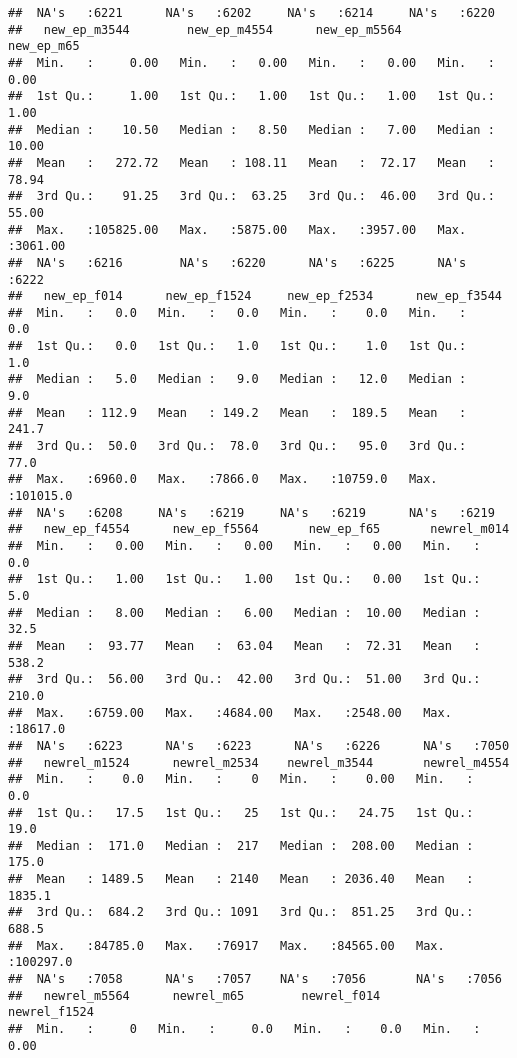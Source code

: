 \documentclass[]{article}
\begin{document}
\begin{verbatim}
##  NA's   :6221      NA's   :6202     NA's   :6214     NA's   :6220     
##   new_ep_m3544        new_ep_m4554      new_ep_m5564       new_ep_m65     
##  Min.   :     0.00   Min.   :   0.00   Min.   :   0.00   Min.   :   0.00  
##  1st Qu.:     1.00   1st Qu.:   1.00   1st Qu.:   1.00   1st Qu.:   1.00  
##  Median :    10.50   Median :   8.50   Median :   7.00   Median :  10.00  
##  Mean   :   272.72   Mean   : 108.11   Mean   :  72.17   Mean   :  78.94  
##  3rd Qu.:    91.25   3rd Qu.:  63.25   3rd Qu.:  46.00   3rd Qu.:  55.00  
##  Max.   :105825.00   Max.   :5875.00   Max.   :3957.00   Max.   :3061.00  
##  NA's   :6216        NA's   :6220      NA's   :6225      NA's   :6222     
##   new_ep_f014      new_ep_f1524     new_ep_f2534      new_ep_f3544     
##  Min.   :   0.0   Min.   :   0.0   Min.   :    0.0   Min.   :     0.0  
##  1st Qu.:   0.0   1st Qu.:   1.0   1st Qu.:    1.0   1st Qu.:     1.0  
##  Median :   5.0   Median :   9.0   Median :   12.0   Median :     9.0  
##  Mean   : 112.9   Mean   : 149.2   Mean   :  189.5   Mean   :   241.7  
##  3rd Qu.:  50.0   3rd Qu.:  78.0   3rd Qu.:   95.0   3rd Qu.:    77.0  
##  Max.   :6960.0   Max.   :7866.0   Max.   :10759.0   Max.   :101015.0  
##  NA's   :6208     NA's   :6219     NA's   :6219      NA's   :6219      
##   new_ep_f4554      new_ep_f5564       new_ep_f65       newrel_m014     
##  Min.   :   0.00   Min.   :   0.00   Min.   :   0.00   Min.   :    0.0  
##  1st Qu.:   1.00   1st Qu.:   1.00   1st Qu.:   0.00   1st Qu.:    5.0  
##  Median :   8.00   Median :   6.00   Median :  10.00   Median :   32.5  
##  Mean   :  93.77   Mean   :  63.04   Mean   :  72.31   Mean   :  538.2  
##  3rd Qu.:  56.00   3rd Qu.:  42.00   3rd Qu.:  51.00   3rd Qu.:  210.0  
##  Max.   :6759.00   Max.   :4684.00   Max.   :2548.00   Max.   :18617.0  
##  NA's   :6223      NA's   :6223      NA's   :6226      NA's   :7050     
##   newrel_m1524      newrel_m2534    newrel_m3544       newrel_m4554     
##  Min.   :    0.0   Min.   :    0   Min.   :    0.00   Min.   :     0.0  
##  1st Qu.:   17.5   1st Qu.:   25   1st Qu.:   24.75   1st Qu.:    19.0  
##  Median :  171.0   Median :  217   Median :  208.00   Median :   175.0  
##  Mean   : 1489.5   Mean   : 2140   Mean   : 2036.40   Mean   :  1835.1  
##  3rd Qu.:  684.2   3rd Qu.: 1091   3rd Qu.:  851.25   3rd Qu.:   688.5  
##  Max.   :84785.0   Max.   :76917   Max.   :84565.00   Max.   :100297.0  
##  NA's   :7058      NA's   :7057    NA's   :7056       NA's   :7056      
##   newrel_m5564      newrel_m65        newrel_f014       newrel_f1524     
##  Min.   :     0   Min.   :     0.0   Min.   :    0.0   Min.   :    0.00  

\end{verbatim}
\end{document}
